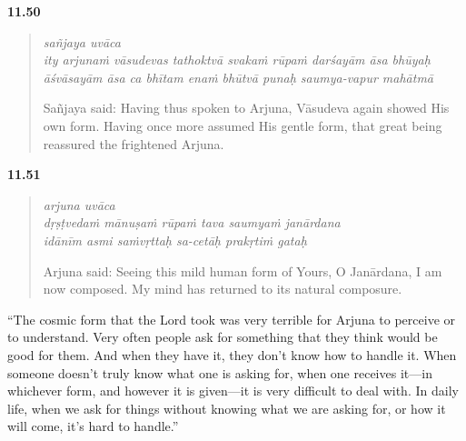\par\noindent\textbf{11.50}\par
\begin{verse}
\textit{sañjaya uvāca} \\
\textit{ity arjunaṁ vāsudevas tathoktvā svakaṁ rūpaṁ darśayām āsa bhūyaḥ āśvāsayām āsa ca bhītam enaṁ bhūtvā punaḥ saumya-vapur mahātmā}

\noindent Sañjaya said: Having thus spoken to Arjuna, Vāsudeva again showed His own form. Having once more assumed His gentle form, that great being reassured the frightened Arjuna.
\end{verse}
\par



\par\noindent\textbf{11.51}\par
\begin{verse}
\textit{arjuna uvāca} \\
\textit{dṛṣṭvedaṁ mānuṣaṁ rūpaṁ tava saumyaṁ janārdana} \\
\textit{idānīm asmi saṁvṛttaḥ sa-cetāḥ prakṛtiṁ gataḥ}

\noindent Arjuna said: Seeing this mild human form of Yours, O Janārdana, I am now composed. My mind has returned to its natural composure.
\end{verse}
\par


\enquote{The cosmic form that the Lord took was very terrible for Arjuna to perceive or to understand. Very often people ask for something that they think would be good for them. And when they have it, they don’t know how to handle it. When someone doesn’t truly know what one is asking for, when one receives it---in whichever form, and however it is given---it is very difficult to deal with. In daily life, when we ask for things without knowing what we are asking for, or how it will come, it’s hard to handle.}

